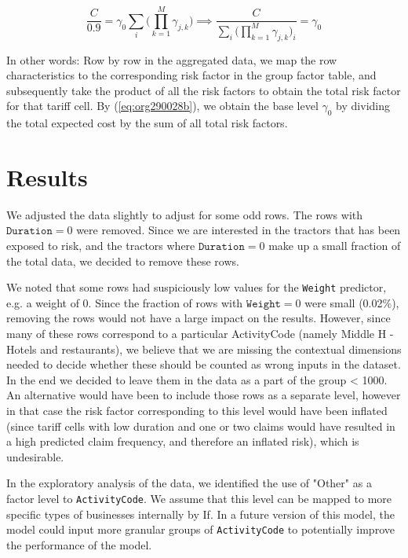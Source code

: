 \documentclass[11pt]{article}
\begin{document}
\begin{enumerate}
\begin{equation}
\label{eq:org290028b}
\frac{C}{0.9} = \gamma_0 \sum_i \bigg ( \prod_{k = 1}^M \gamma_{j,k} \bigg) \implies \frac{C}{\sum_i \bigg ( \prod_{k = 1}^M \gamma_{j,k} \bigg)_i} = \gamma_0
\end{equation}

In other words: Row by row in the aggregated data, we map the row characteristics to the
corresponding risk factor  in the group factor table, and subsequently take the product of all 
the risk factors to obtain the total risk factor for that tariff cell. By (\ref{eq:org290028b}), we obtain the 
base level \(\gamma_0\) by dividing the total expected cost by the sum of all total risk factors.
\end{enumerate}

\section{Results}
\label{sec:orgeda6ed5}

We adjusted the data slightly to adjust for some odd rows. The rows with \(\texttt{Duration} = 0\) were removed. 
Since we are interested in the tractors that has been exposed to risk, and the tractors where 
\(\texttt{Duration} = 0\) make up a small fraction of the total data, we decided to remove these rows. 

We noted that some rows had suspiciously low values for the \texttt{Weight} predictor, e.g. a weight of 0. 
Since the fraction of rows with \(\texttt{Weight} = 0\) were small (0.02\%), removing the rows would not have
a large impact on the results. However, since many 
of these rows correspond to a particular ActivityCode (namely Middle H - Hotels and restaurants), 
we believe that we are missing the contextual dimensions needed to decide whether these should be counted 
as wrong inputs in the dataset. In the end we decided to leave them in the data as a part of the
group < 1000. An alternative would have been to include those rows as a separate level, however in that case the risk factor
corresponding to this level would have been inflated (since tariff cells with low duration and one or two
claims would have resulted in a high predicted claim frequency, and therefore an inflated risk), which 
is undesirable.

In the exploratory analysis of the data, we identified the use of "Other" as a factor level to \texttt{ActivityCode}. 
We assume that this level can be mapped to more specific types of businesses internally by If. In a future version
of this model, the model could input more granular groups of \texttt{ActivityCode} to potentially improve 
the performance of the model.
\end{document}
